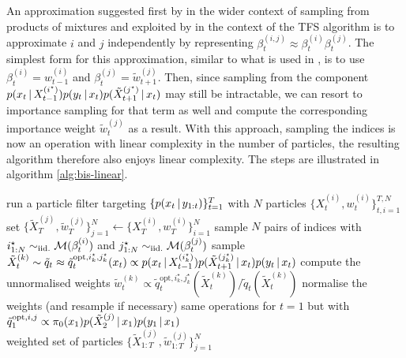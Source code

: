 An approximation suggested first by \citet{briers05} in the wider context of sampling from products of mixtures and exploited by \citet{fearnhead10} in the context of the TFS algorithm is to approximate $i$ and $j$ independently by representing $\beta^{(i,j)}_{t}\approx \beta^{(i)}_{t}\beta^{(j)}_{t}$. The simplest form for this approximation, similar to what is used in \citet{fearnhead10}, is to use $\beta^{(i)}_{t} = w^{(i)}_{t-1}$ and $\beta^{(j)}_{t}=\tilde w^{(j)}_{t+1}$. 
Then, since sampling from the component $p(x_{t}\,|\, X^{(i^{\star})}_{t-1})p(y_{t}\,|\, x_{t})p(\tilde X^{(j^{\star})}_{t+1}\,|\, x_{t})$ may still be intractable, we can resort to importance sampling for that term as well and compute the corresponding importance weight $\tilde w_{t}^{(j)}$ as a result.
With this approach, sampling the indices is now an operation with linear complexity in the number of particles, the resulting algorithm therefore also enjoys linear complexity. 
The steps are illustrated in algorithm \ref{alg:bis-linear}.
%
\begin{algorithm}[!h]\small
	\caption{\label{alg:bis-linear}}
	\begin{algorithmic}[1]
		\State run a particle filter targeting $\{p(x_{t}\,|\, y_{1:t})\}_{t=1}^{T}$ with $N$ particles $\{X^{(i)}_{t}, w^{(i)}_{t}\}_{t,i=1}^{T,N}$
		\State set $\{\tilde X^{(j)}_{T},\tilde w^{(j)}_{T}\}_{j=1}^{N}\leftarrow \{X^{(i)}_{T},w^{(i)}_{T}\}_{i=1}^{N}$
			\State sample $N$ pairs of indices with $i^{\star}_{1:N} \sim_{\mathrm{iid.}} \mathcal M(\beta^{(i)}_{t})$ and $j^{\star}_{1:N}\sim_{\mathrm{iid.}} \mathcal M(\beta^{(j)}_{t})$
				\State sample $\tilde X^{(k)}_{t}\sim \tilde  q_{t} \approx \tilde q_{t}^{\text{opt}, i^{\star}_{k}, j^{\star}_{k}}(x_{t}) \propto p(x_{t}\,|\, X^{(i^{\star}_{k})}_{t-1})p(\tilde X^{(j^{\star}_{k})}_{t+1}\,|\, x_{t})p(y_{t}\,|\, x_{t})$
	    			\State compute the unnormalised weights $\tilde w^{(k)}_{t} \propto \tilde q^{\text{opt}, i^{\star}_{k},j^{\star}_{k}}_{t}(\tilde X^{(k)}_{t})/\tilde q_{t}(\tilde X^{(k)}_{t})$
			\EndFor
			\State normalise the weights (and resample if necessary)
		\EndFor
	\State same operations for $t=1$ but with $\tilde q^{\text{opt},i,j}_{1} \propto \pi_{0}(x_{1})p(\tilde X^{(j)}_{2}\,|\, x_{1})p(y_{1}\,|\, x_{1})$\\
	\Return weighted set of particles $\{\tilde X^{(j)}_{1:T}, \tilde w^{(j)}_{1:T}\}_{j=1}^{N}$
	\end{algorithmic}
\end{algorithm}

